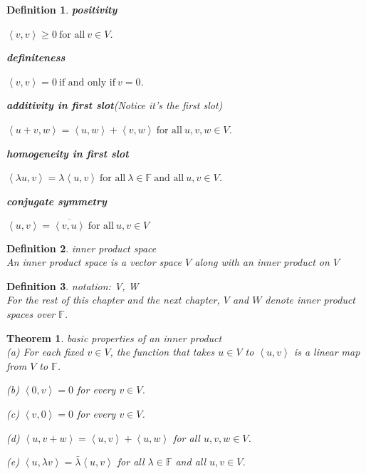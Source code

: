 \documentclass{article}
\newtheorem{theorem}{Theorem}[subsection]
\newtheorem{definition}{Definition}[subsection]
\newcommand{\FF}{\mathbb{F}}
\begin{document}
\begin{CJK}{UTF8}{gkai}
\begin{definition}
    \textbf{positivity}

    $\left<v, v\right> \geq 0 ~\text{for all}~ v \in V$.

    \textbf{definiteness}

    $\left<v, v\right> = 0 ~\text{if and only if}~ v = 0$.

    \textbf{additivity in first slot}(Notice it's the first slot)

    $\left<u +v,w\right> = \left<u,w\right>+\left<v,w\right> ~\text{for all}~ u,v,w \in V$.

    \textbf{homogeneity in first slot}

    $\left<\lambda u,v\right> = \lambda\left<u,v\right> ~\text{for all}~ \lambda \in \FF ~\text{and all}~ u,v \in V$.
    
    \textbf{conjugate symmetry}
    
    $\left<u, v\right> = \overline{\left<v,u\right>} ~\text{for all}~ u,v \in V$
\end{definition}

\begin{definition}
    inner product space\\

    An inner product space is a vector space $V$ along with an inner product on $V$
\end{definition}

\begin{definition}
    notation: V, W\\

    For the rest of this chapter and the next chapter, $V$ and $W$ denote inner product spaces over $\FF$.
\end{definition}

\begin{theorem}
    basic properties of an inner product\\

    (a) For each fixed $v \in V$, the function that takes $u \in V$ to $\left<u,v\right>$ is a linear map from $V$ to $\FF$.

    (b) $\left<0,v\right> = 0$ for every $v \in V$.

    (c) $\left<v,0\right> = 0$ for every $v \in V$.

    (d) $\left<u,v + w\right> = \left<u,v\right>+\left<u,w\right>$ for all $u,v,w \in V$.

    (e) $\left<u, \lambda v\right> = \bar{\lambda}\left<u,v\right>$ for all $\lambda \in \FF$ and all $u,v \in V$.
    

\end{theorem}
\end{CJK}
\end{document}
